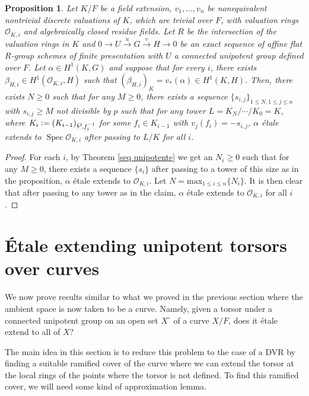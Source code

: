 \documentclass[a4paper,english,12pt]{amsart}
\newtheorem{proposition}[definition]{Proposition}
\numberwithin{equation}{section}
\newcommand{\defeq}{\vcentcolon=}
\DeclareMathOperator{\Spec}{Spec}
\renewcommand{\leq}{\leqslant}
\renewcommand{\geq}{\geqslant}
\renewcommand{\wp}{\ensuremath\raisebox{\depth}{$\mathchar"17D$}}
\renewcommand{\_}{\rule{0.25cm}{0.4pt}}
\begin{document}
\begin{proposition}\label{extensao multipla}
    Let $K/F$ be a field extension, $v_{1},\dots ,v_{n}$ be nonequivalent nontrivial discrete valuations of $K$, which are trivial over $F$, with valuation rings $\mathcal{O}_{K,i}$ and algebraically closed residue fields. Let $R$ be the intersection of the valuation rings in $K$ and $0\to U\xrightarrow{u} G\xrightarrow{v} H\to 0$ be an exact sequence of affine flat $R$-group schemes of finite presentation with $U$ a connected unipotent group defined over $F$.  Let $\alpha\in H^{1}(K,G)$ and suppose that for every $i$, there exists $\beta_{H,i}\in H^{1}(\mathcal{O}_{K,i},H)$ such that $(\beta_{H,i})_{K}=v_{\ast}(\alpha)\in H^{1}(K,H)$. Then, there exists $N\geq 0$ such that for any $M\geq 0$, there exists a sequence $\{s_{i,j}\}_{1\leq N, 1\leq j\leq n}$ with $s_{i,j}\geq M$ not divisible by $p$ such that for any tower $L=K_{N}/\cdots/K_{0}=K$, where $K_{i}\defeq (K_{i-1})_{\wp,f_{i}^{-1}}$ for some $f_{i}\in K_{i-1}$ with $v_{j}(f_{i})=-s_{i,j}$, $\alpha$ étale extends to $\Spec \mathcal{O}_{K,i}$ after passing to $L/K$ for all $i$.
\end{proposition}
\begin{proof}
    For each $i$, by Theorem \ref{seq unipotente} we get an $N_{i}\geq 0$ such that for any $M\geq 0$, there exists a sequence $\{s_{i}\}$ after passing to a tower of this size as in the proposition, $\alpha$ étale extends to $\mathcal{O}_{K,i}$. Let $N=\text{max}_{1\leq i\leq n}\{N_{i}\}$. It is then clear that after passing to any tower as in the claim, $\alpha$ étale extends to $\mathcal{O}_{K,i}$ for all $i$.
\end{proof}

\section{Étale extending unipotent torsors over curves}\label{4}
We now prove results similar to what we proved in the previous section where the ambient space is now taken to be a curve. Namely, given a torsor under a connected unipotent group on an open set $X^{\circ}$ of a curve $X/F$, does it étale extend to all of $X$?

The main idea in this section is to reduce this problem to the case of a DVR by finding a suitable ramified cover of the curve where we can extend the torsor at the local rings of the points where the torsor is not defined. To find this ramified cover, we will need some kind of approximation lemma.
\end{document}
